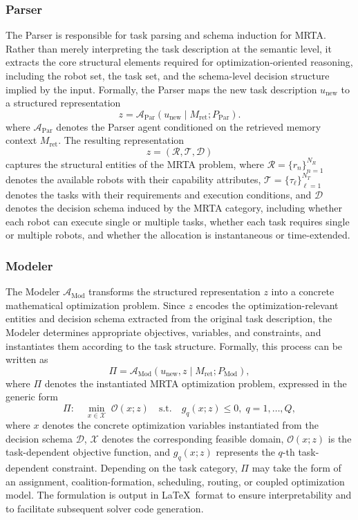 \documentclass[letterpaper,journal]{IEEEtran}
\begin{document}
\subsubsection{Parser}
The Parser is responsible for task parsing and schema induction for MRTA. Rather than merely interpreting the task description at the semantic level, it extracts the core structural elements required for optimization-oriented reasoning, including the robot set, the task set, and the schema-level decision structure implied by the input. Formally, the Parser maps the new task description \(u_{\mathrm{new}}\) to a structured representation
\begin{equation}
z=\mathcal{A}_{\mathrm{Par}}(u_{\mathrm{new}}\mid M_{\mathrm{ret}};P_{\mathrm{Par}}).
\end{equation}
where \(\mathcal{A}_{\mathrm{Par}}\) denotes the Parser agent conditioned on the retrieved memory context \(M_{\mathrm{ret}}\). The resulting representation
\[
z = (\mathcal{R}, \mathcal{T}, \mathcal{D})
\]
captures the structural entities of the MRTA problem, where 
\(\mathcal{R}=\{r_n\}_{n=1}^{N_R}\) denotes the available robots with their capability attributes, 
\(\mathcal{T}=\{\tau_\ell\}_{\ell=1}^{N_T}\) denotes the tasks with their requirements and execution conditions, and \(\mathcal{D}\) denotes the decision schema induced by the MRTA category, including whether each robot can execute single or multiple tasks, whether each task requires single or multiple robots, and whether the allocation is instantaneous or time-extended.



\subsubsection{Modeler}
The Modeler \(\mathcal{A}_{\mathrm{Mod}}\) transforms the structured representation \(z\) into a concrete mathematical optimization problem. Since \(z\) encodes the optimization-relevant entities and decision schema extracted from the original task description, the Modeler determines appropriate objectives, variables, and constraints, and instantiates them according to the task structure. Formally, this process can be written as
\begin{equation}
\Pi=\mathcal{A}_{\mathrm{Mod}}(u_{\mathrm{new}},z\mid M_{\mathrm{ret}};P_{\mathrm{Mod}}),
\end{equation}
where \(\Pi\) denotes the instantiated MRTA optimization problem, expressed in the generic form
\begin{equation}
\Pi:\quad
\min_{x\in\mathcal{X}}\; \mathcal{O}(x;z)
\quad \text{s.t.} \quad
g_q(x;z)\le 0,\; q=1,\dots,Q,
\end{equation}
where \(x\) denotes the concrete optimization variables instantiated from the decision schema \(\mathcal{D}\), \(\mathcal{X}\) denotes the corresponding feasible domain, \(\mathcal{O}(x;z)\) is the task-dependent objective function, and \(g_q(x;z)\) represents the \(q\)-th task-dependent constraint. Depending on the task category, \(\Pi\) may take the form of an assignment, coalition-formation, scheduling, routing, or coupled optimization model. The formulation is output in \LaTeX\ format to ensure interpretability and to facilitate subsequent solver code generation.
\end{document}
